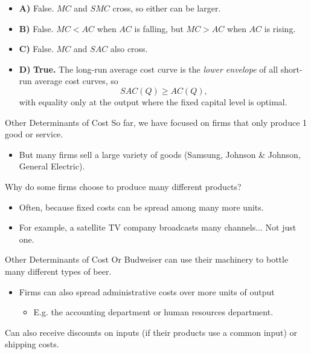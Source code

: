 \documentclass{beamer}
\begin{document}
\begin{frame}

\bigskip

\begin{itemize}
    \item \textbf{A)} False. $MC$ and $SMC$ cross, so either can be larger.
    
    \item \textbf{B)} False. $MC<AC$ when $AC$ is falling, but $MC>AC$ when $AC$ is rising.
    
    \item \textbf{C)} False. $MC$ and $SAC$ also cross.
    
    \item \textbf{D)} \textbf{True.} The long-run average cost curve is the \emph{lower envelope} of all short-run average cost curves, so
    \[
    SAC(Q)\ge AC(Q),
    \]
    with equality only at the output where the fixed capital level is optimal.
\end{itemize}

\bigskip
\begin{center}
\end{center}

\end{frame}

\begin{frame}{Other Determinants of Cost}
  So far, we have focused on firms that only produce 1 good or service.

  \begin{itemize}
    \item But many firms sell a large variety of goods (Samsung, Johnson \& Johnson, General Electric).
  \end{itemize}

  \bigskip
  Why do some firms choose to produce many different products?
  \begin{itemize}    
    \item Often, because fixed costs can be spread among many more units.
    
    \item For example, a satellite TV company broadcasts many channels... Not just one.
  \end{itemize}
\end{frame}

\begin{frame}{Other Determinants of Cost}
  Or Budweiser can use their machinery to bottle many different types of beer.

  \begin{itemize}
    \item Firms can also spread administrative costs over more units of output
    \begin{itemize}
      \item E.g. the accounting department or human resources department.
    \end{itemize}
  \end{itemize}

  Can also receive discounts on inputs (if their products use a common input) or shipping costs.
\end{frame}
\end{document}
